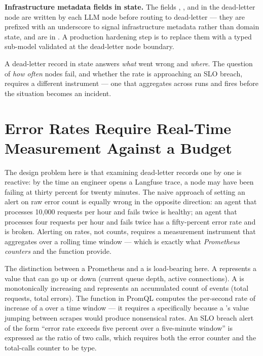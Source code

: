 \begin{notebox}
  \textbf{Infrastructure metadata fields in state.}
  The fields , , and
   in the dead-letter node are written by each
  LLM node before routing to dead-letter --- they are prefixed with an
  underscore to signal infrastructure metadata rather than domain state,
  and are  in . A production hardening
  step is to replace them with a typed  sub-model
  validated at the dead-letter node boundary.
\end{notebox}

A dead-letter record in state answers \emph{what} went wrong and
\emph{where}. The question of \emph{how often} nodes fail, and whether
the rate is approaching an SLO breach, requires a different instrument ---
one that aggregates across runs and fires before the situation becomes an
incident.

\section{Error Rates Require Real-Time Measurement Against a Budget}
\label{sec:error-budget-tracking}

The design problem here is that examining dead-letter records one by one
is reactive: by the time an engineer opens a Langfuse trace, a node may
have been failing at thirty percent for twenty minutes. The naive approach
of setting an alert on raw error count is equally wrong in the opposite
direction: an agent that processes 10,000 requests per hour and fails twice
is healthy; an agent that processes four requests per hour and fails twice
has a fifty-percent error rate and is broken. Alerting on rates, not counts,
requires a measurement instrument that aggregates over a rolling time window
--- which is exactly what \emph{Prometheus counters} and the 
function provide.

The distinction between a Prometheus  and a  is
load-bearing here. A  represents a value that can go up or down
(current queue depth, active connections). A  is monotonically
increasing and represents an accumulated count of events (total requests,
total errors). The  function in PromQL computes the
per-second rate of increase of a  over a time window --- it
requires a  specifically because a 's value
jumping between scrapes would produce nonsensical rates. An SLO breach alert
of the form ``error rate exceeds five percent over a five-minute window'' is
expressed as the ratio of two  calls, which requires both the
error counter and the total-calls counter to be  type.

